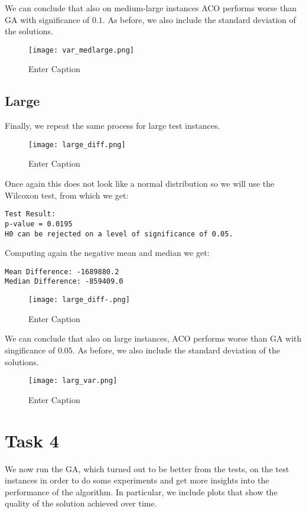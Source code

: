 \documentclass{article}
\begin{document}
We can conclude that also on medium-large instances ACO performs worse than GA with significance of $0.1$.
As before, we also include the standard deviation of the solutions.

\begin{figure}[H]
    \centering
    \texttt{[image: var\_medlarge.png]}
    \caption{Enter Caption}
    \label{fig:enter-label}
\end{figure}

\subsection{Large}

Finally, we repeat the same process for large test instances.
\begin{figure}[H]
    \centering
    \texttt{[image: large\_diff.png]}
    \caption{Enter Caption}
    \label{fig:enter-label}
\end{figure}
Once again this does not look like a normal distribution so we will use the Wilcoxon test, from which we get:
\begin{verbatim}
Test Result: 
p-value = 0.0195 
H0 can be rejected on a level of significance of 0.05.  
\end{verbatim}
Computing again the negative mean and median we get:
\begin{verbatim}
Mean Difference: -1689880.2 
Median Difference: -859409.0 
\end{verbatim}
\begin{figure}[H]
    \centering
    \texttt{[image: large\_diff-.png]}
    \caption{Enter Caption}
    \label{fig:enter-label}
\end{figure}

We can conclude that also on large instances, ACO performs worse than GA with singificance of $0.05$.
As before, we also include the standard deviation of the solutions.

\begin{figure}[H]
    \centering
    \texttt{[image: larg\_var.png]}
    \caption{Enter Caption}
    \label{fig:enter-label}
\end{figure}

\section{Task 4}

We now run the GA, which turned out to be better from the tests, on the test instances in order to do some experiments and get more insights into the performance of the algorithm. In particular, we include plots that show the quality of the solution achieved over time.
\end{document}
